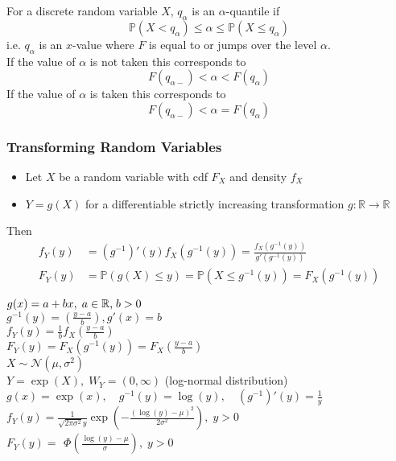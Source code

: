 For a discrete random variable $X$, $q_\alpha$ is an $\alpha$-quantile if
\begin{equation*}
    \mathbb{P}(X<q_\alpha)\le\alpha\le\mathbb{P}(X\le q_\alpha)
\end{equation*}
i.e. $q_\alpha$ is an $x$-value where $F$ is equal to or jumps over the level $\alpha$.\\
If the value of $\alpha$ is not taken this corresponds to
\begin{equation*}
    F(q_{\alpha-})< \alpha < F(q_{\alpha})
\end{equation*}
If the value of $\alpha$ is taken this corresponds to
\begin{equation*}
    F(q_{\alpha-})< \alpha = F(q_{\alpha})
\end{equation*}

\subsubsection{Transforming Random Variables}
\begin{itemize}
    \item Let $X$ be a random variable with cdf $F_X$ and density $f_X$
    \item $Y=g(X)$ for a differentiable strictly increasing transformation $g:\mathbb{R}\to\mathbb{R}$
\end{itemize}
Then
\begin{align*}
    f_Y(y)   & =(g^{-1})'(y)f_X(g^{-1}(y))=\frac{f_X(g^{-1}(y))}{g'(g^{-1}(y))}     \\
    F_{Y}(y) & =\mathbb{P}(g(X)\leq y)=\mathbb{P}(X\leq g^{-1}(y))=F_{X}(g^{-1}(y))
\end{align*}


$g(x)=a+bx,\;a\in\mathbb{R}\text,\;b>0$\\
$g^{-1}(y)=\left(\frac{y-a}b\right), g'(x)=b$\\
$f_Y(y)=\frac1bf_X\left(\frac{y-a}b\right)$\\
$F_Y(y)=F_X(g^{-1}(y))=F_X\left(\frac{y-a}b\right)$\\

$X\sim\mathcal{N}(\mu,\sigma^2)$\\
$Y=\exp(X),\;W_Y=(0,\infty)$ (log-normal distribution)\\
$g(x)=\exp(x),\quad g^{-1}(y)=\log(y),\quad(g^{-1})'(y)=\frac{1}{y}$\\
$f_Y(y)=\frac{1}{\sqrt{2\pi\sigma^2}y}\exp\left(-\frac{(\log(y)-\mu)^2}{2\sigma^2}\right),\;y>0$\\
$F_Y(y)=\begin{aligned}\Phi\left(\frac{\log(y)-\mu}\sigma\right),\;y>0\end{aligned}$

